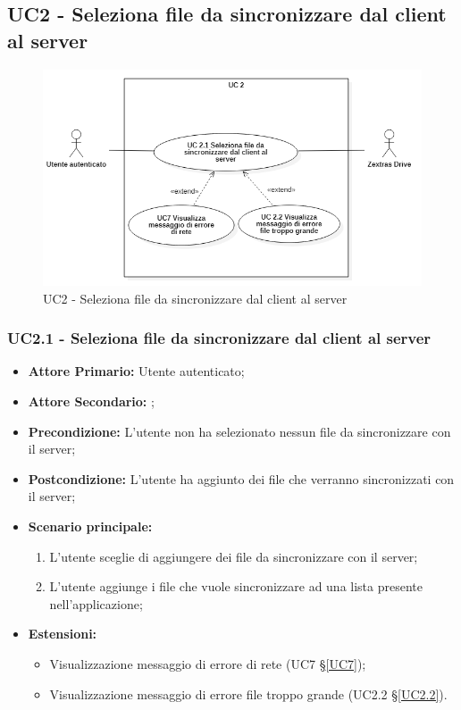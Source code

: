 \subsection{UC2 - Seleziona file da sincronizzare dal client al server}
\begin{figure}[H]
    \centering
    \includegraphics[scale = 0.6]{components/img/UC2.png}
    \caption{UC2 - Seleziona file da sincronizzare dal client al server}
\end{figure}
\subsubsection{UC2.1 - Seleziona file da sincronizzare dal client al server}
\begin{itemize}
\item \textbf{Attore Primario:} Utente autenticato;
\item \textbf{Attore Secondario:} ;
\item \textbf{Precondizione:} L'utente non ha selezionato nessun file da sincronizzare con il server;
\item \textbf{Postcondizione:} L'utente ha aggiunto dei file che verranno sincronizzati con il server;
\item \textbf{Scenario principale:}
    \begin{enumerate}
    \item L'utente sceglie di aggiungere dei file da sincronizzare con il server;
    \item L'utente aggiunge i file che vuole sincronizzare ad una lista presente nell'applicazione;
    \end{enumerate}
\item \textbf{Estensioni:}
    \begin{itemize}
    \item Visualizzazione messaggio di errore di rete (UC7 \S{}\ref{UC7});
    \item Visualizzazione messaggio di errore file troppo grande (UC2.2 \S{}\ref{UC2.2}).
    \end{itemize}
\end{itemize}
